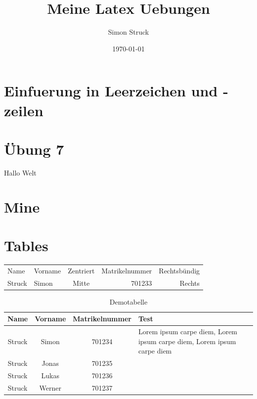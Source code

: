 \documentclass[a4paper,twoside,10pt]{article}
\title{Meine Latex Uebungen}
\author{Simon Struck}
\date{\today}
\begin{document}
	\maketitle
	\newpage
	\tableofcontents
	\newpage
	
	\section{Einfuerung in Leerzeichen und -zeilen}
	
	\newpage
	
	\begin{abstract}
		
	\end{abstract}
	
	\section{Übung 7}
	
	Hallo Welt
	
	
	\section{Mine}
	
	
	\section{Tables}
	
	\begin{tabular}{l|l|c|r|r}
		Name & Vorname & Zentriert & Matrikelnummer & Rechtsbündig \\
		Struck & Simon & Mitte & 701233 & Rechts \\
	\end{tabular}
	\begin{table}
		\centering
		\begin{tabular}{cccp{4cm}}
			\toprule
			\textbf{Name} & \textbf{Vorname} & \textbf{Matrikelnummer} & \textbf{Test}\\
			\midrule
			Struck & Simon & 701234 & Lorem ipsum carpe diem, Lorem ipsum carpe diem, Lorem ipsum carpe diem \\
			Struck & Jonas & 701235 & ~ \\
			Struck & Lukas & 701236 & ~ \\
			Struck & Werner & 701237 & ~ \\
			\bottomrule
		\end{tabular}
		\caption{Demotabelle}
		\label{tab:demotabelle}
	\end{table}
	
\end{document}
